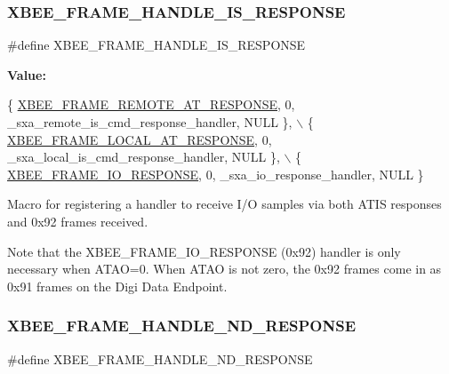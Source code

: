 \subsubsection{\texorpdfstring{X\+B\+E\+E\+\_\+\+F\+R\+A\+M\+E\+\_\+\+H\+A\+N\+D\+L\+E\+\_\+\+I\+S\+\_\+\+R\+E\+S\+P\+O\+N\+SE}{XBEE\_FRAME\_HANDLE\_IS\_RESPONSE}}
{\footnotesize\ttfamily \#define X\+B\+E\+E\+\_\+\+F\+R\+A\+M\+E\+\_\+\+H\+A\+N\+D\+L\+E\+\_\+\+I\+S\+\_\+\+R\+E\+S\+P\+O\+N\+SE}

{\bfseries Value\+:}
\begin{DoxyCode}
\{ \hyperlink{group__xbee__device_gga7753bbebaf00d6d64942f64b6ae9b7b9a3cd726459592fab4cdc9b5e6bbecb79f}{XBEE\_FRAME\_REMOTE\_AT\_RESPONSE}, 0, \_sxa\_remote\_is\_cmd\_response\_handler, NULL 
      \}, \(\backslash\)
   \{ \hyperlink{group__xbee__device_gga7753bbebaf00d6d64942f64b6ae9b7b9ae66771334070219cd098c8201936cf4a}{XBEE\_FRAME\_LOCAL\_AT\_RESPONSE}, 0, \_sxa\_local\_is\_cmd\_response\_handler, NULL 
      \},  \(\backslash\)
   \{ \hyperlink{group__xbee__device_gga7753bbebaf00d6d64942f64b6ae9b7b9abd1291a130de887d7b01cae0f5adbe25}{XBEE\_FRAME\_IO\_RESPONSE}, 0, \_sxa\_io\_response\_handler, NULL \}
\end{DoxyCode}


Macro for registering a handler to receive I/O samples via both A\+T\+IS responses and 0x92 frames received. 

Note that the X\+B\+E\+E\+\_\+\+F\+R\+A\+M\+E\+\_\+\+I\+O\+\_\+\+R\+E\+S\+P\+O\+N\+SE (0x92) handler is only necessary when A\+T\+AO=0. When A\+T\+AO is not zero, the 0x92 frames come in as 0x91 frames on the Digi Data Endpoint. \mbox{\label{group___s_x_a_ga988e2b4c52622034d041f38848881a09}} 
\subsubsection{\texorpdfstring{X\+B\+E\+E\+\_\+\+F\+R\+A\+M\+E\+\_\+\+H\+A\+N\+D\+L\+E\+\_\+\+N\+D\+\_\+\+R\+E\+S\+P\+O\+N\+SE}{XBEE\_FRAME\_HANDLE\_ND\_RESPONSE}}
{\footnotesize\ttfamily \#define X\+B\+E\+E\+\_\+\+F\+R\+A\+M\+E\+\_\+\+H\+A\+N\+D\+L\+E\+\_\+\+N\+D\+\_\+\+R\+E\+S\+P\+O\+N\+SE}

